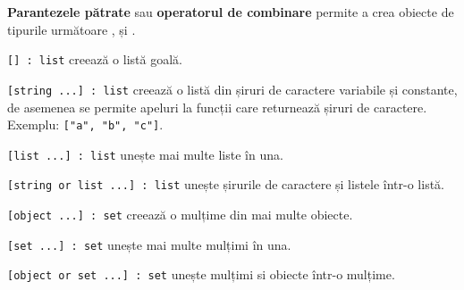 {\bf Parantezele pătrate} sau {\bf operatorul de combinare} permite a crea obiecte de tipurile următoare \listtype{}, \set{} și \object{}.

\texttt{[] : list} creează o listă goală.

\texttt{[string ...] : list} creează o listă din șiruri de caractere variabile și constante, de asemenea se permite apeluri la funcții care returnează șiruri de caractere. Exemplu: \texttt{["a", "b", "c"]}.

\texttt{[list ...] : list} unește mai multe liste în una.

\texttt{[string or list ...] : list} unește șirurile de caractere și listele într-o listă.

\texttt{[object ...] : set} creează o mulțime din mai multe obiecte.

\texttt{[set ...] : set} unește mai multe mulțimi în una.

\texttt{[object or set ...] : set} unește mulțimi si obiecte într-o mulțime.

